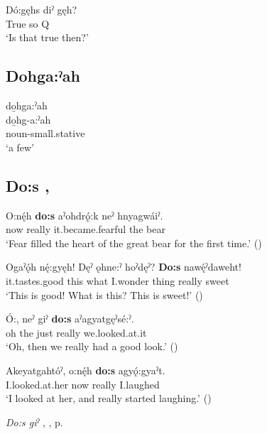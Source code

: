 \ea
\label{ex:dpart63}
\gll Dó:gęhs diˀ gęh? \\
True so Q\\
\glt ‘Is that true then?’
\z


\subsection*{\textbf{Dohga:ˀah} } \label{p:[dohga:ˀah]}

\ea
\label{ex:dpart580}
do̱hga:ˀah {}\\
\gll do̱hg-a:ˀah\\
noun-small.stative\\
\glt ‘a few’
\z



\subsection*{\textbf{Do:s} , } \label{p:[do:s]}

\ea
\label{ex:dpart66}
\gll O:nę́h \textbf{do:s} aˀohdrǫ́:k neˀ hnyagwáiˀ. \\
now really it.became.fearful the bear\\
\glt ‘Fear filled the heart of the great bear for the first time.’ (\cite{carrier_legends_2013})
\z

\ea
\label{ex:dpart67}
\gll Ogaˀǫ́h nę́:gyęh! Dęˀ ǫhne:ˀ hoˀdęˀ? \textbf{Do:s} nawę́ˀdaweht! \\
it.tastes.good this what I.wonder thing really sweet \\
\glt ‘This is good! What is this? This is sweet!’ (\cite{carrier_legends_2013})
\z

\ea
\label{ex:dpart68}
\gll Ó:, neˀ giˀ \textbf{do:s} aˀagyatgęˀsé:ˀ. \\
oh the just really we.looked.at.it \\
\glt ‘Oh, then we really had a good look.’ (\cite{henry_de_2005})
\z

\ea
\label{ex:dpart69}
\gll Akeyatgahtóˀ, o:nę́h \textbf{do:s} agyǫ́:gyaˀt. \\
I.looked.at.her now really I.laughed\\
\glt ‘I looked at her, and really started laughing.’ (\cite{henry_de_2005})
\z

\begin{CayugaRelated}
\item \textit{Do:s giˀ} , , p. \pageref{p:[do:s giˀ]}
\end{CayugaRelated}


